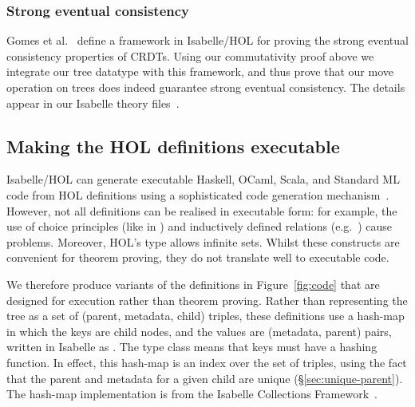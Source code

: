 \documentclass[sigplan,anonymous]{acmart}
\begin{document}
\subsubsection{Strong eventual consistency}

Gomes et al.~\cite{Gomes:2017gy} define a framework in Isabelle/HOL for proving the strong eventual consistency properties of CRDTs.
Using our commutativity proof above we integrate our tree datatype with this framework, and thus prove that our move operation on trees does indeed guarantee strong eventual consistency.
The details appear in our Isabelle theory files~\cite{SourceFiles}.

\subsection{Making the HOL definitions executable} \label{subsect.extracting}

Isabelle/HOL can generate executable Haskell, OCaml, Scala, and Standard ML code from HOL definitions using a sophisticated code generation mechanism~\cite{DBLP:conf/flops/HaftmannN10}.
However, not all definitions can be realised in executable form: for example, the use of choice principles (like in ) and inductively defined relations (e.g.\ ) cause problems.
Moreover, HOL's  type allows infinite sets.
Whilst these constructs are convenient for theorem proving, they do not translate well to executable code.

We therefore produce variants of the definitions in Figure~\ref{fig:code} that are designed for execution rather than theorem proving.
Rather than representing the tree as a set of (parent, metadata, child) triples, these definitions use a hash-map in which the keys are child nodes, and the values are (metadata, parent) pairs, written in Isabelle as .
The  type class means that keys must have a hashing function.
In effect, this hash-map is an index over the set of triples, using the fact that the parent and metadata for a given child are unique (\S\ref{sec:unique-parent}).
The hash-map implementation is from the Isabelle Collections Framework~\cite{DBLP:conf/itp/LammichL10}.
\end{document}
